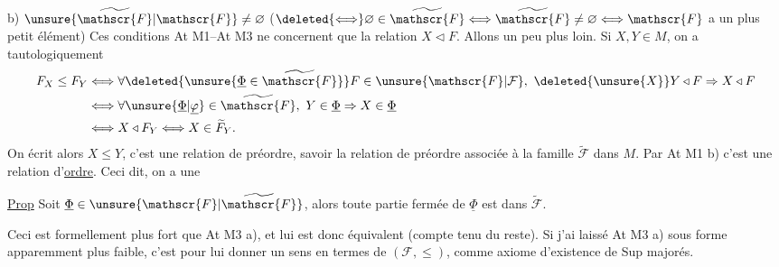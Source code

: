 b) $\unsure{\widetilde{\mathscr{F}}|\mathscr{F}}\neq\varnothing$ ($\deleted{\Longleftrightarrow}\varnothing\in\widetilde{\mathscr{F}}\Longleftrightarrow\widetilde{\mathscr{F}}\neq\varnothing\Longleftrightarrow\mathscr{F}$ a un plus petit élément)
Ces conditions At M1--At M3  ne concernent que \deleted{$\unsure{\Leftarrow|\leftarrow|\triangleleft}$} la relation $X\triangleleft F$. Allons un peu plus loin. Si $X,Y\in M$, on a tautologiquement
\[
\begin{aligned}
F_X\leq F_Y&\Longleftrightarrow\forall\deleted{\unsure{\underline{\Phi}\in\widetilde{\mathscr{F}}}}F\in\unsure{\mathscr{F}|\mathcal{F}},\ \deleted{\unsure{X}}Y\triangleleft F\Rightarrow X\triangleleft F\\
&\Longleftrightarrow\forall\unsure{\underline{\Phi}|\underline{\varphi}}\in\widetilde{\mathscr{F}},\ Y\in\underline{\Phi}\Rightarrow X\in\underline{\Phi}\\
&\Longleftrightarrow X\triangleleft F_Y\Longleftrightarrow X\in\widetilde{F}_Y.
\end{aligned}
\]
On écrit alors $X\leq Y$, c'est une relation de préordre, savoir la relation de préordre associée à la famille  $\widetilde{\mathscr{F}}$ dans $M$. Par At M1 b) c'est une relation d'\uline{ordre}. Ceci dit, on a une


\uline{Prop} Soit $\underline{\Phi}\in\unsure{\mathscr{F}|\widetilde{\mathscr{F}}}$, alors toute partie fermée \inserted{$\Psi$} de $\underline{\Phi}$ est dans $\widetilde{\mathscr{F}}$.

Ceci  est formellement plus fort que At M3 a), et lui est donc équivalent (compte tenu du reste). Si j'ai laissé At M3 a) sous forme apparemment plus faible, c'est pour lui donner un sens en termes de $(\mathscr{F},\leq)$, comme axiome d'existence de Sup majorés.

